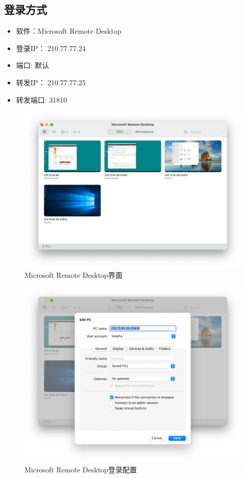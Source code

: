 \documentclass[
]{ctexbook}
\providecommand{\tightlist}{%
  \setlength{\itemsep}{0pt}\setlength{\parskip}{0pt}}
\begin{document}
\hypertarget{ux767bux5f55ux65b9ux5f0f}{%
\subsection{登录方式}\label{ux767bux5f55ux65b9ux5f0f}}

\begin{itemize}
\tightlist
\item
  软件：Microsoft Remote Desktop
\item
  登录IP： 210.77.77.24
\item
  端口: 默认
\item
  转发IP： 210.77.77.25
\item
  转发端口: 31810
\end{itemize}

\begin{figure}
\centering
\includegraphics{Fig/ch5/rdp-1.png}
\caption{Microsoft Remote Desktop界面}
\end{figure}

\begin{figure}
\centering
\includegraphics{Fig/ch5/rdp-2.png}
\caption{Microsoft Remote Desktop登录配置}
\end{figure}
\end{document}
